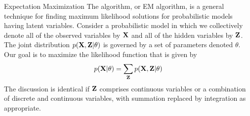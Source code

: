 \documentclass[9pt]{article}
\begin{document}
\begin{topic}{em}{Expectation Maximization}
The  algorithm, or EM algorithm, is a general technique for finding maximum likelihood solutions for probabilistic models having latent variables.
Consider a probabilistic model in which we collectively denote all of the observed variables by $\mathbf{X}$ and all of the hidden variables by $\mathbf{Z}$. The joint distribution $p(\mathbf{X}, \mathbf{Z}|\theta)$ is governed by a set of parameters denoted $\theta$. Our goal is to maximize the likelihood function that is given by
\[
p(\mathbf{X}|\theta) = \sum_{\mathbf{Z}}p(\mathbf{X},\mathbf{Z}|\theta)
\]
The discussion is identical if $\mathbf{Z}$ comprises continuous variables or a combination of discrete and continuous variables, with summation replaced by integration as appropriate.


\end{topic}
\end{document}
